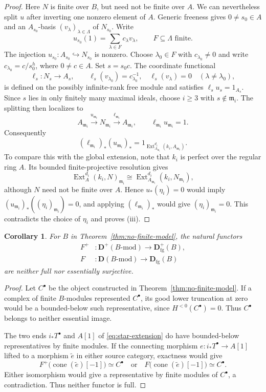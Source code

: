 \documentclass[11pt]{amsart}
\numberwithin{equation}{section}
\newtheorem{corollary}[theorem]{Corollary}
\theoremstyle{definition}
\theoremstyle{remark}
\DeclareMathOperator{\Ext}{Ext}
\DeclareMathOperator{\cone}{cone}
\newcommand{\D}{\mathbf D}
\newcommand{\fg}{\mathrm{fg}}
\newcommand{\m}{\mathfrak m}
\begin{document}
\begin{proof}
Here $N$ is finite over $B$, but need not be finite over $A$.
We can nevertheless split $u$ after inverting one nonzero element
of $A$. Generic freeness \cite[Lemma~10.118.1, Tag~051R]{Stacks} gives
$0\ne s_0\in A$ and an $A_{s_0}$-basis $(v_\lambda)_{\lambda\in\Lambda}$
of $N_{s_0}$. Write
\[
 u_{s_0}(1)=\sum_{\lambda\in F}c_\lambda v_\lambda,
 \qquad F\subseteq\Lambda\text{ finite}.
\]
The injection $u_{s_0}:A_{s_0}\hookrightarrow N_{s_0}$ is nonzero.
Choose $\lambda_0\in F$ with $c_{\lambda_0}\ne0$ and write
$c_{\lambda_0}=c/s_0^h$, where $0\ne c\in A$. Set $s=s_0c$.
The coordinate functional
\[
 \ell_s:N_s\longrightarrow A_s,\qquad
 \ell_s(v_{\lambda_0})=c_{\lambda_0}^{-1},\quad
 \ell_s(v_\lambda)=0\quad(\lambda\ne\lambda_0),
\]
is defined on the possibly infinite-rank free module and satisfies
$\ell_su_s=1_{A_s}$. Since $s$ lies in only finitely many maximal
ideals, choose $i\geq3$ with $s\notin\m_i$. The splitting then
localizes to
\[
 A_{\m_i}\xrightarrow{u_{\m_i}}N_{\m_i}
 \xrightarrow{\ell_{\m_i}}A_{\m_i},
 \qquad\ell_{\m_i}u_{\m_i}=1.
\]
Consequently
\[
 (\ell_{\m_i})_*(u_{\m_i})_*
 =1_{\Ext_{A_{\m_i}}^{d_i}(k_i,A_{\m_i})}.
\]
To compare this with the global extension, note that $k_i$ is
perfect over the regular ring $A$. Its bounded finite-projective
resolution gives
\[
 \Ext_A^{d_i}(k_i,N)_{\m_i}
 \cong\Ext_{A_{\m_i}}^{d_i}(k_i,N_{\m_i}),
\]
although $N$ need not be finite over $A$. Hence
$u_*(\eta_i)=0$ would imply
$(u_{\m_i})_*((\eta_i)_{\m_i})=0$, and applying
$(\ell_{\m_i})_*$ would give $(\eta_i)_{\m_i}=0$.
This contradicts the choice of $\eta_i$ and proves (iii).
\end{proof}

\begin{corollary}\label{cor:comparison-failure}
For $B$ in Theorem~\ref{thm:no-finite-model}, the natural functors
\[
 \begin{aligned}
 F^+&:\D^+(B\text{-}\mathrm{mod})\longrightarrow\D^+_{\fg}(B),\\
 F&:\D(B\text{-}\mathrm{mod})\longrightarrow\D_{\fg}(B)
 \end{aligned}
\]
are neither full nor essentially surjective.
\end{corollary}
\begin{proof}
Let $C^{\bullet}$ be the object constructed in Theorem~\ref{thm:no-finite-model}.
If a complex of finite $B$-modules represented $C^{\bullet}$, its good lower
truncation at zero would be a bounded-below such representative,
since $H^{<0}(C^{\bullet})=0$. Thus $C^{\bullet}$ belongs to neither essential image.

The two ends $i_*T^{\bullet}$ and $A[1]$ of
\eqref{eq:star-extension} do have bounded-below representatives
by finite modules. If the connecting morphism
$e:i_*T^{\bullet}\to A[1]$ lifted to a morphism $\widetilde e$ in
either source category, exactness would give
\[
 F^+\bigl(\cone(\widetilde e)[-1]\bigr)\simeq C^\bullet
 \quad\text{or}\quad
 F\bigl(\cone(\widetilde e)[-1]\bigr)\simeq C^\bullet.
\]
Either isomorphism would give a representative by finite modules of
$C^\bullet$, a contradiction. Thus neither functor is full.
\end{proof}
\end{document}
